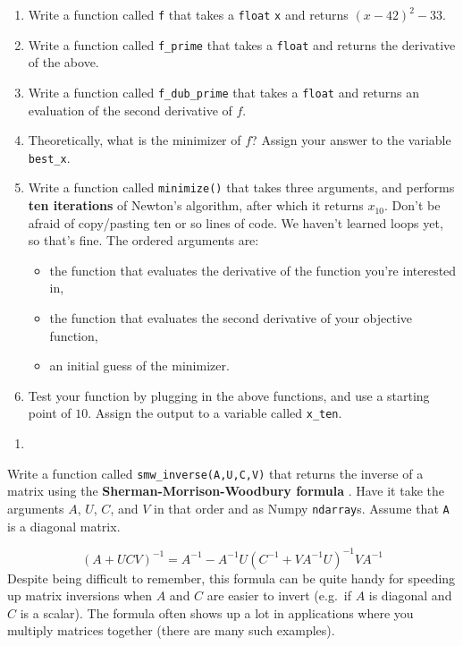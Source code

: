 \documentclass[
  12pt,
  krantz2]{krantz}
\providecommand{\tightlist}{%
  \setlength{\itemsep}{0pt}\setlength{\parskip}{0pt}}
\begin{document}
\begin{enumerate}
\def\labelenumi{\alph{enumi})}
\tightlist
\item
  Write a function called \texttt{f} that takes a \texttt{float} \texttt{x} and returns \((x-42)^2 - 33\).
\item
  Write a function called \texttt{f\_prime} that takes a \texttt{float} and returns the derivative of the above.
\item
  Write a function called \texttt{f\_dub\_prime} that takes a \texttt{float} and returns an evaluation of the second derivative of \(f\).
\item
  Theoretically, what is the minimizer of \(f\)? Assign your answer to the variable \texttt{best\_x}.
\item
  Write a function called \texttt{minimize()} that takes three arguments, and performs \textbf{ten iterations} of Newton's algorithm, after which it returns \(x_{10}\). Don't be afraid of copy/pasting ten or so lines of code. We haven't learned loops yet, so that's fine. The ordered arguments are:

  \begin{itemize}
  \tightlist
  \item
    the function that evaluates the derivative of the function you're interested in,
  \item
    the function that evaluates the second derivative of your objective function,
  \item
    an initial guess of the minimizer.
  \end{itemize}
\item
  Test your function by plugging in the above functions, and use a starting point of \(10\). Assign the output to a variable called \texttt{x\_ten}.
\end{enumerate}

\begin{enumerate}
\def\labelenumi{\arabic{enumi}.}
\setcounter{enumi}{1}
\tightlist
\item
\end{enumerate}

Write a function called \texttt{smw\_inverse(A,U,C,V)} that returns the inverse of a matrix using the \textbf{Sherman-Morrison-Woodbury formula} \citep{woodbury}. Have it take the arguments \(A\), \(U\), \(C\), and \(V\) in that order and as Numpy \texttt{ndarray}s. Assume that \texttt{A} is a diagonal matrix.

\begin{equation} 
(A + UCV)^{-1} = A^{-1} - A^{-1}U(C^{-1} + VA^{-1}U)^{-1}V A^{-1}
\end{equation}
Despite being difficult to remember, this formula can be quite handy for speeding up matrix inversions when \(A\) and \(C\) are easier to invert (e.g.~if \(A\) is diagonal and \(C\) is a scalar). The formula often shows up a lot in applications where you multiply matrices together (there are many such examples).
\end{document}

